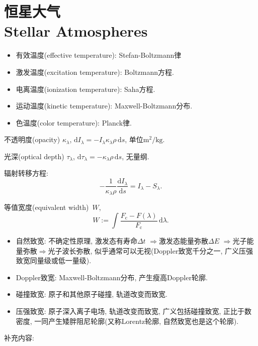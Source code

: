 \chapter{恒星大气\\Stellar Atmospheres}

\begin{itemize}
    \item 有效温度(effective temperature): Stefan-Boltzmann律
    \item 激发温度(excitation temperature): Boltzmann方程.
    \item 电离温度(ionization temperature): Saha方程.
    \item 运动温度(kinetic temperature): Maxwell-Boltzmann分布.
    \item 色温度(color temperature): Planck律.
\end{itemize}

不透明度(opacity) $\kappa_\lambda$, $\mathrm{d}I_\lambda
=-I_\lambda\kappa_\lambda\rho\,\mathrm{d}s$, 单位$\text{m}^2/\text{kg}$.

光深(optical depth) $\tau_\lambda$, $\mathrm{d}\tau_\lambda=-\kappa_\lambda\rho\,\mathrm{d}s$, 无量纲.

辐射转移方程:
\begin{equation*}
    -\frac{1}{\kappa_\lambda\rho}\frac{\mathrm{d}I_\lambda}{\mathrm{d}s}
    =I_\lambda-S_\lambda.
\end{equation*}

等值宽度(equivalent width)~$W$,
\begin{equation*}
    W:=\int\frac{F_\text{c}-F(\lambda)}{F_\text{c}}\,\mathrm{d}\lambda.
\end{equation*}

\begin{itemize}
    \item 自然致宽: 不确定性原理, 激发态有寿命$\Delta t$ $\Rightarrow$激发态能量弥散$\Delta E$ $\Rightarrow$光子能量弥散$\Rightarrow$光子波长弥散, 似乎通常可以无视(Doppler致宽千分之一, 广义压强致宽同量级或低一量级).
    \item Doppler致宽: Maxwell-Boltzmann分布, 产生瘦高Doppler轮廓.
    \item 碰撞致宽: 原子和其他原子碰撞, 轨道改变而致宽.
    \item 压强致宽: 原子深入离子电场, 轨道改变而致宽, 广义包括碰撞致宽, 正比于数密度, 一同产生矮胖阻尼轮廓(又称Lorentz轮廓, 自然致宽也是这个轮廓).
\end{itemize}

补充内容:

